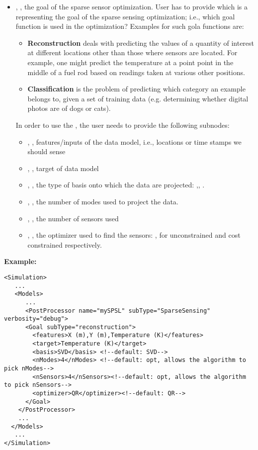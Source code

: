 \begin{itemize}
\item {}, , the goal of the sparse sensor optimization.
User has to provide  which is a  representing the goal of the sparse sensing optimization; i.e., which goal function is used in the optimization? Examples for such gola functions are:
\begin{itemize}
    \item \textbf{Reconstruction} deals with predicting the values of a quantity of interest at different locations other than those where sensors are located. For example, one might predict the temperature at a point point in the middle of a fuel rod based on readings taken at various other positions.

    \item \textbf{Classification} is the problem of predicting which category an example belongs to, given a set of training data (e.g. determining whether digital photos are of dogs or cats).
\end{itemize}
In order to use the , the user needs to provide the following subnodes:
\begin{itemize}
	\item {}, , features/inputs of the data model, i.e., locations or time stamps we should sense
	\item {}, , target of data model
	\item {} , , the type of basis onto which the data are projected: ,, . 
	\item {},  , the number of modes  used to project the data.
	\item {},  , the number of sensors used
	\item {},  , the optimizer used to find the sensors: ,  for unconstrained and cost constrained respectively.
\end{itemize}
\end{itemize}

\textbf{Example:}
\begin{lstlisting}[style=XML]
<Simulation>
   ...
   <Models>
      ...
      <PostProcessor name="mySPSL" subType="SparseSensing" verbosity="debug">
      <Goal subType="reconstruction">
        <features>X (m),Y (m),Temperature (K)</features>
        <target>Temperature (K)</target>
        <basis>SVD</basis> <!--default: SVD-->
        <nModes>4</nModes> <!--default: opt, allows the algorithm to pick nModes-->
        <nSensors>4</nSensors><!--default: opt, allows the algorithm to pick nSensors-->
        <optimizer>QR</optimizer><!--default: QR-->
      </Goal>
    </PostProcessor>
    ...
  </Models>
   ...
</Simulation>
\end{lstlisting}